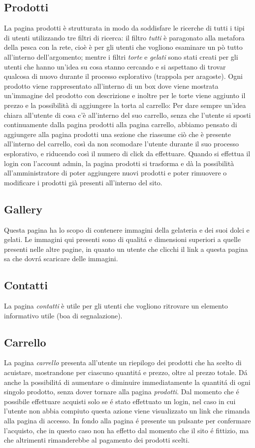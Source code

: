     \subsection{Prodotti}
		La pagina prodotti è strutturata in modo da soddisfare le ricerche di tutti i tipi di utenti utilizzando tre filtri di ricerca:
		il filtro \emph{tutti} è paragonato alla metafora della pesca con la rete, cioè è per gli utenti che vogliono esaminare un pò tutto all’interno dell’argomento;
		mentre i filtri \emph{torte} e \emph{gelati}  sono stati creati per gli utenti che hanno un’idea su cosa stanno cercando e si aspettano di trovar qualcosa di nuovo durante il processo esplorativo (trappola per aragoste).
		Ogni prodotto viene rappresentato all’interno di un box dove viene mostrata un’immagine del prodotto con descrizione e inoltre per le torte viene aggiunto il prezzo e la possibilità di aggiungere la torta al carrello:
		Per dare sempre un’idea chiara all’utente di cosa c’è all’interno del suo carrello, senza che l’utente si sposti continuamente dalla pagina prodotti alla pagina carrello, abbiamo pensato di aggiungere alla pagina prodotti una sezione che riassume ciò che è presente all’interno del carrello, così da non scomodare l’utente durante il suo processo esplorativo, e riducendo così il numero di click da effettuare.
		Quando si effettua il login con l'account admin, la pagina prodotti si trasforma e dà la possibilità all’amministratore di poter aggiungere nuovi prodotti e poter rimuovere o modificare i prodotti già presenti all’interno del sito.
	\subsection{Gallery}
		Questa pagina ha lo scopo di contenere immagini della gelateria e dei suoi dolci e gelati.
		Le immagini qui presenti sono di qualit\'a e dimensioni superiori a quelle presenti nelle altre pagine, in quanto un utente che clicchi il link a questa pagina sa che dovr\'a scaricare delle immagini.
    \subsection{Contatti}
		La pagina \emph{contatti} è utile per gli utenti che vogliono ritrovare un elemento informativo utile (boa di segnalazione).
    \subsection{Carrello}
		La pagina \emph{carrello} presenta all'utente un riepilogo dei prodotti che ha scelto di acuistare, mostrandone per ciascuno quantit\'a e prezzo, oltre al prezzo totale.
		D\'a anche la possibilit\'a di aumentare o diminuire immediatamente la quantit\'a di ogni singolo prodotto, senza dover tornare alla pagina \emph{prodotti}.
		Dal momento che \'e possibile effettuare acquisti solo se \'e stato effettuato un login, nel caso in cui l'utente non abbia compiuto questa azione viene visualizzato un link che rimanda alla pagina di accesso.
		In fondo alla pagina \'e presente un pulsante per confermare l'acquisto, che in questo caso non ha effetto dal momento che il sito \'e fittizio, ma che altrimenti rimanderebbe al pagamento dei prodotti scelti.
